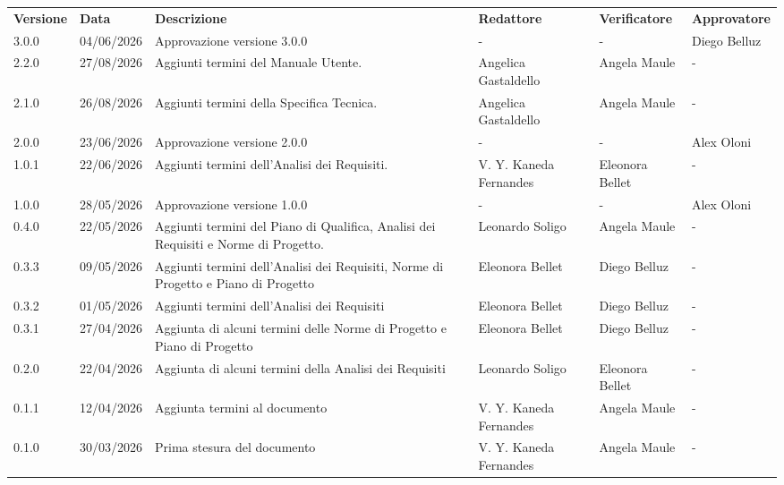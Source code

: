 \documentclass[a4paper,12pt]{article}
\begin{document}
\renewcommand{\arraystretch}{1.35}
\begin{center}
    {\footnotesize
    \begin{tabularx}{\textwidth}{|l|l|X|p{2cm}|p{2cm}|p{2cm}|}
        \hline
        \rowcolor{gray!20}
        \textbf{Versione} & \textbf{Data} & \textbf{Descrizione} & \textbf{Redattore} & \textbf{Verificatore} & \textbf{Approvatore} \\
        3.0.0 & 04/06/2026 & Approvazione versione 3.0.0 & - & - & Diego Belluz \\
        2.2.0 & 27/08/2026 & Aggiunti termini del Manuale Utente. & Angelica Gastaldello & Angela Maule & - \\
        2.1.0 & 26/08/2026 & Aggiunti termini della Specifica Tecnica. & Angelica Gastaldello & Angela Maule & - \\
        2.0.0 & 23/06/2026 & Approvazione versione 2.0.0 & - & - & Alex Oloni \\
        1.0.1 & 22/06/2026 & Aggiunti termini dell'Analisi dei Requisiti. & V. Y. Kaneda Fernandes & Eleonora Bellet & - \\
        1.0.0 & 28/05/2026 & Approvazione versione 1.0.0 & - & - & Alex Oloni \\
        0.4.0 & 22/05/2026 & Aggiunti termini del Piano di Qualifica, Analisi dei Requisiti e Norme di Progetto. & Leonardo Soligo & Angela Maule & - \\
        0.3.3 & 09/05/2026 & Aggiunti termini dell'Analisi dei Requisiti, Norme di Progetto e Piano di Progetto & Eleonora Bellet & Diego Belluz & - \\
        0.3.2 & 01/05/2026 & Aggiunti termini dell'Analisi dei Requisiti & Eleonora Bellet & Diego Belluz & - \\
        0.3.1 & 27/04/2026 & Aggiunta di alcuni termini delle Norme di Progetto e Piano di Progetto & Eleonora Bellet & Diego Belluz & - \\
        0.2.0 & 22/04/2026 & Aggiunta di alcuni termini della Analisi dei Requisiti& Leonardo Soligo & Eleonora Bellet & - \\
        0.1.1 & 12/04/2026 & Aggiunta termini al documento & V. Y. Kaneda Fernandes & Angela Maule & - \\
        0.1.0 & 30/03/2026 & Prima stesura del documento & V. Y. Kaneda Fernandes & Angela Maule & - \\
        \hline 
    \end{tabularx}
    }
\end{center}
\end{document}

